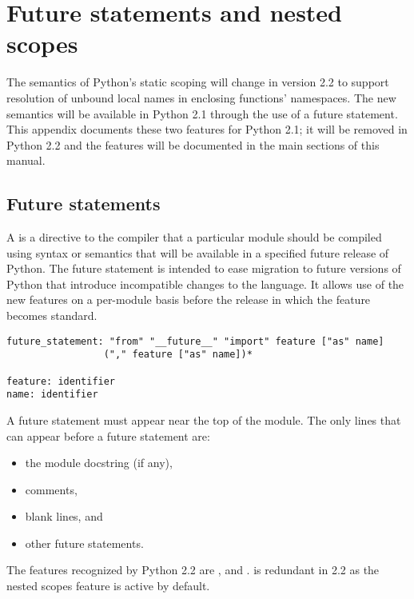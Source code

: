 \chapter{Future statements and nested scopes \label{futures}}


The semantics of Python's static scoping will change in version 2.2 to
support resolution of unbound local names in enclosing functions'
namespaces.  The new semantics will be available in Python 2.1 through
the use of a future statement.  This appendix documents these two
features for Python 2.1; it will be removed in Python 2.2 and the
features will be documented in the main sections of this manual.


\section{Future statements \label{future-statements}}

A  is a directive to
the compiler that a particular module should be compiled using syntax
or semantics that will be available in a specified future release of
Python.  The future statement is intended to ease migration to future
versions of Python that introduce incompatible changes to the
language.  It allows use of the new features on a per-module basis
before the release in which the feature becomes standard.

\begin{verbatim}
future_statement: "from" "__future__" "import" feature ["as" name]
                 ("," feature ["as" name])*

feature: identifier
name: identifier
\end{verbatim}

A future statement must appear near the top of the module.  The only
lines that can appear before a future statement are:

\begin{itemize}

\item the module docstring (if any),
\item comments,
\item blank lines, and
\item other future statements.

\end{itemize}

The features recognized by Python 2.2 are ,
 and .   
is redundant in 2.2 as the nested scopes feature is active by default.


